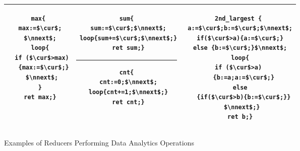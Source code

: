 \begin{figure}
	\centering
	\lstset{language=C,
		basicstyle=\ttfamily\scriptsize}
	\begin{tabular}{|c|c|c|}
		\hline
		\begin{minipage}[t]{0.23\textwidth}
		\vspace{-0.5cm}
			\begin{lstlisting}[mathescape=true]
max{
 max:=$\cur$;
 $\nnext$;
 loop{
  if ($\cur$>max)
   {max:=$\cur$;}
  $\nnext$;
 }
 ret max;}
	\end{lstlisting}
		\end{minipage}&
		\begin{minipage}[t]{0.27\textwidth}
		\vspace{-0.5cm}
			\begin{lstlisting}[mathescape=true]
sum{
 sum:=$\cur$;$\nnext$;
 loop{sum+=$\cur$;$\nnext$;}
 ret sum;}
			\end{lstlisting}
\hrule\vspace{0.1cm}%
			\begin{lstlisting}[mathescape=true]
cnt{
 cnt:=0;$\nnext$;
 loop{cnt+=1;$\nnext$;}
 ret cnt;}
			\end{lstlisting}			
		\end{minipage}&
		\begin{minipage}[t]{0.30\textwidth}
		\vspace{-0.5cm}			
			\begin{lstlisting}[mathescape=true]
2nd_largest {
 a:=$\cur$;b:=$\cur$;$\nnext$;
 if($\cur$>a){a:=$\cur$;}
 else {b:=$\cur$;}$\nnext$;
 loop{
  if ($\cur$>a)  
   {b:=a;a:=$\cur$;}
  else 
   {if($\cur$>b){b:=$\cur$;}}
  $\nnext$;}
 ret b;}
			\end{lstlisting}		
		\end{minipage}\\
		\hline		
	\end{tabular}
	\caption{Examples of Reducers Performing Data Analytics Operations}
	\label{fig:examples}
\end{figure}
\vspace{-0.5cm}
